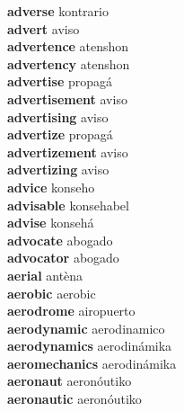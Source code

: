 \textbf{adverse } kontrario \\
\textbf{advert } aviso \\
\textbf{advertence } atenshon \\
\textbf{advertency } atenshon \\
\textbf{advertise } propagá \\
\textbf{advertisement } aviso \\
\textbf{advertising } aviso \\
\textbf{advertize } propagá \\
\textbf{advertizement } aviso \\
\textbf{advertizing } aviso \\
\textbf{advice } konseho \\
\textbf{advisable } konsehabel \\
\textbf{advise } konsehá \\
\textbf{advocate } abogado \\
\textbf{advocator } abogado \\
\textbf{aerial } antèna \\
\textbf{aerobic } aerobic \\
\textbf{aerodrome } airopuerto \\
\textbf{aerodynamic } aerodinamico \\
\textbf{aerodynamics } aerodinámika \\
\textbf{aeromechanics } aerodinámika \\
\textbf{aeronaut } aeronóutiko \\
\textbf{aeronautic } aeronóutiko \\
